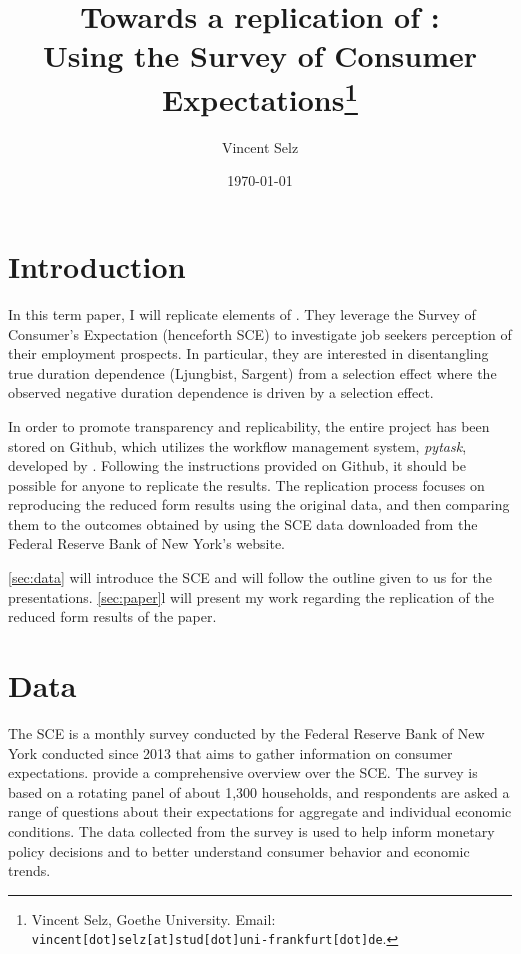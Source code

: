 \documentclass[11pt,a4paper,leqno]{article}
\title{Towards a replication of \textcite{MST2021}:  \\ Using the Survey of Consumer Expectations\thanks{Vincent Selz, Goethe University. Email: \texttt{vincent[dot]selz[at]stud[dot]uni-frankfurt[dot]de}. } }
\author{Vincent Selz}
\date{
	\today
}
\begin{document}
\maketitle


\clearpage
\section{Introduction}



In this term paper, I will replicate elements of \textcite{MST2021}. They leverage the Survey of Consumer's Expectation (henceforth SCE) to investigate job seekers perception of their employment prospects. In particular, they are interested in disentangling true duration dependence (Ljungbist, Sargent) from a selection effect where the observed negative duration dependence is driven by a selection effect. 

In order to promote transparency and replicability, the entire project has been stored on Github, which utilizes the workflow management system, \textit{pytask}, developed by \textcite{Raabe2020}.  Following the instructions provided on Github, it should be possible for anyone  to replicate the results. The replication process focuses on reproducing the reduced form results using the original data, and then comparing them to the outcomes obtained by using the SCE data downloaded from the Federal Reserve Bank of New York's website.

\autoref{sec:data} will introduce the SCE and will  follow the outline given to us for the presentations. 
\autoref{sec:paper}l will present my work regarding the replication of the reduced form results of the paper. 

\section{Data} \label{sec:data}
The SCE is a monthly survey conducted by the Federal Reserve Bank of New York conducted since 2013 that aims to gather information on consumer expectations. \textcite{SCEOverview} provide a comprehensive overview over the SCE. The survey is based on a rotating panel of about 1,300 households, and respondents are asked a range of questions about their expectations for aggregate and individual economic conditions. The data collected from the survey is used to help inform monetary policy decisions and to better understand consumer behavior and economic trends.
\end{document}
